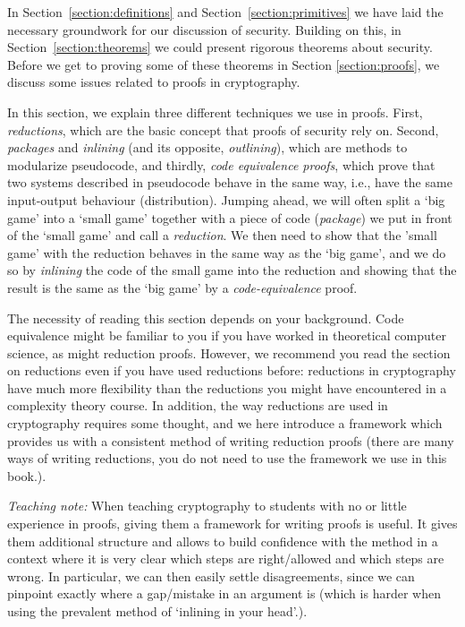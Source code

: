 In Section~\ref{section:definitions} and Section~\ref{section:primitives} we have laid the necessary groundwork for our discussion of security. Building on this, in Section~\ref{section:theorems} we could present rigorous theorems about security. Before we get to proving some of these theorems in Section \ref{section:proofs}, we discuss some issues related to proofs in cryptography.

In this section, we explain three different techniques we use in proofs. First, \emph{reductions}, which are the basic concept that proofs of security rely on. Second, \emph{packages} and \emph{inlining} (and its opposite, \emph{outlining}), which are methods to modularize pseudocode, and thirdly, \emph{code equivalence proofs}, which
 prove that two systems described in pseudocode behave in the same way, i.e., have the same input-output behaviour (distribution). Jumping ahead, we will often split a `big game' into a `small game' together with a piece of code (\emph{package}) we put in front of the `small game' and call a \emph{reduction}. We then need to show that the 'small game' with the reduction behaves in the same way as the `big game', and we do so by \emph{inlining} the code of the small game into the reduction and showing that the result is the same as the `big game' by a \emph{code-equivalence} proof.


The necessity of reading this section depends on your background. Code equivalence might be familiar to you if you have worked in theoretical computer science, as might reduction proofs. However, we recommend you read the section on reductions even if you have used reductions before:
reductions in cryptography have much more flexibility than the reductions you might have encountered in a complexity theory course. In addition,
the way reductions are used in cryptography requires some thought, and we here introduce a framework which provides us with a consistent method  of writing reduction proofs (there are many ways of writing reductions, you do not need to use the framework we use in this book.).

\emph{Teaching note:} When teaching cryptography to students with no or little experience in proofs, giving them a framework for writing proofs is useful. It gives them additional structure and allows to build confidence with the method in a context where it is very clear which steps are right/allowed and which steps are wrong. In particular, we can then easily settle disagreements, since we can pinpoint exactly where a gap/mistake in an argument is (which is harder when using the prevalent method of `inlining in your head'.).